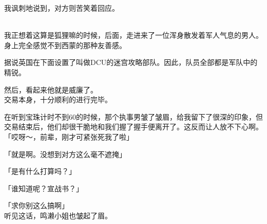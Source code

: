 我讽刺地说到，对方则苦笑着回应。\\


\\

我正想着这算是狐狸嘛的时候，后面，走进来了一位浑身散发着军人气息的男人。身上完全感觉不到西蒙的那种友善感。

据说英国在下面设置了叫做DCU的迷宫攻略部队。因此，队员全部都是军队中的精锐。

然后，看起来他就是威廉了。\\

交易本身，十分顺利的进行完毕。

在听到宝珠计时不到60的时候，那个执事男皱了皱眉，给我留下了很深的印象，但交易结束后，他们却很干脆地和我们握了握手便离开了。这反而让人放不下心啊。\\

「哎呀～，前辈，刚才可紧张死我了啦」

「就是啊。没想到对方这么毫不遮掩」

「是有什么打算吗？」

「谁知道呢？宣战书？」

「求你别这么搞啊」\\

听见这话，鸣濑小姐也皱起了眉。\\

